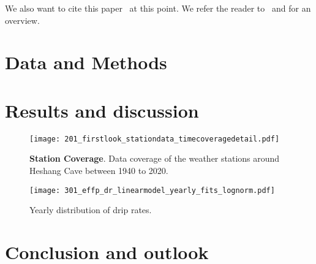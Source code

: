 \lipsum[4-4]

We also want to cite this paper~\cite{goswami2018abrupt} at this point. We refer the reader to~\cite{ghil2002advanced} and \cite{reichstein2019deep} for an overview.


\section{Data and Methods}
\label{data_methods}

\lipsum[2-4]


\section{Results and discussion}
\label{results_discussion}

\lipsum[2-3]
\begin{figure}[!tbh]
    \centering
    \texttt{[image: 201\_firstlook\_stationdata\_timecoveragedetail.pdf]}
    \caption{\textbf{Station Coverage}. Data coverage of the weather stations around Heshang Cave between 1940 to 2020.}
    \label{fig:station_coverage}
\end{figure}

\lipsum[5-5]

\begin{figure}[!tbh]
    \centering
    \texttt{[image: 301\_effp\_dr\_linearmodel\_yearly\_fits\_lognorm.pdf]}
    \caption{Yearly distribution of drip rates.}
    \label{fig:my_label}
\end{figure}

\lipsum[9-12]


\section{Conclusion and outlook}
\label{concl_outlook}

\lipsum[1-2]






